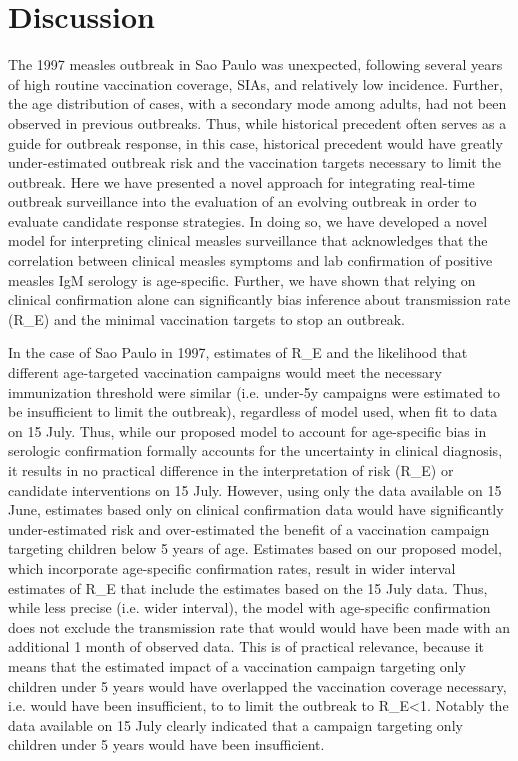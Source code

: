 \section{Discussion}\label{discussion}

The 1997 measles outbreak in Sao Paulo was unexpected, following several
years of high routine vaccination coverage, SIAs, and relatively low
incidence. Further, the age distribution of cases, with a secondary mode
among adults, had not been observed in previous outbreaks. Thus, while
historical precedent often serves as a guide for outbreak response, in
this case, historical precedent would have greatly under-estimated
outbreak risk and the vaccination targets necessary to limit the
outbreak. Here we have presented a novel approach for integrating
real-time outbreak surveillance into the evaluation of an evolving
outbreak in order to evaluate candidate response strategies. In doing
so, we have developed a novel model for interpreting clinical measles
surveillance that acknowledges that the correlation between clinical
measles symptoms and lab confirmation of positive measles IgM serology
is age-specific. Further, we have shown that relying on clinical
confirmation alone can significantly bias inference about transmission
rate (R\_E) and the minimal vaccination targets to stop an outbreak.

In the case of Sao Paulo in 1997, estimates of R\_E and the likelihood
that different age-targeted vaccination campaigns would meet the
necessary immunization threshold were similar (i.e. under-5y campaigns
were estimated to be insufficient to limit the outbreak), regardless of
model used, when fit to data on 15 July. Thus, while our proposed model
to account for age-specific bias in serologic confirmation formally
accounts for the uncertainty in clinical diagnosis, it results in no
practical difference in the interpretation of risk (R\_E) or candidate
interventions on 15 July. However, using only the data available on 15
June, estimates based only on clinical confirmation data would have
significantly under-estimated risk and over-estimated the benefit of a
vaccination campaign targeting children below 5 years of age. Estimates
based on our proposed model, which incorporate age-specific confirmation
rates, result in wider interval estimates of R\_E that include the
estimates based on the 15 July data. Thus, while less precise (i.e.
wider interval), the model with age-specific confirmation does not
exclude the transmission rate that would would have been made with an
additional 1 month of observed data. This is of practical relevance,
because it means that the estimated impact of a vaccination campaign
targeting only children under 5 years would have overlapped the
vaccination coverage necessary, i.e. would have been insufficient, to to
limit the outbreak to R\_E\textless{}1. Notably the data available on 15
July clearly indicated that a campaign targeting only children under 5
years would have been insufficient.

